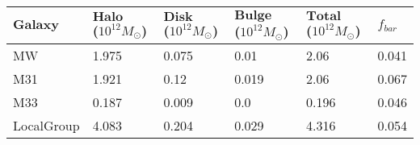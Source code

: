 \documentclass{article}
\begin{document}
\centering


\begin{table}
\begin{tabular}{|p{3cm}||p{3cm}|p{3cm}|p{3cm}|p{3cm}|p{3cm}|}
\hline
$\textbf{Galaxy}$ & $\textbf{Halo Mass}$ ($10^{12} M_{\odot}$) & $\textbf{Disk Mass}$ ($10^{12} M_{\odot}$) & $\textbf{Bulge Mass}$ ($10^{12} M_{\odot}$) & $\textbf{Total Mass}$ ($10^{12} M_{\odot}$) & $f_{bar}$ \\
\hline
MW & 1.975 & 0.075 & 0.01 & 2.06 & 0.041 \\
\hline
M31 & 1.921 & 0.12 & 0.019 & 2.06 & 0.067 \\
\hline
M33 & 0.187 & 0.009 & 0.0 & 0.196 & 0.046 \\
\hline
LocalGroup & 4.083 & 0.204 & 0.029 & 4.316 & 0.054\\
\hline
\end{tabular}
\end{table}
\end{document}
